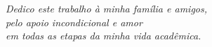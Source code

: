 \begin{dedicatoria}
	\vspace*{\fill}
	\begin{flushright}
		\textit{Dedico este trabalho à minha família e amigos, \\
		pelo apoio incondicional e amor \\
		em todas as etapas da minha vida acadêmica.}
	\end{flushright}
\end{dedicatoria}
